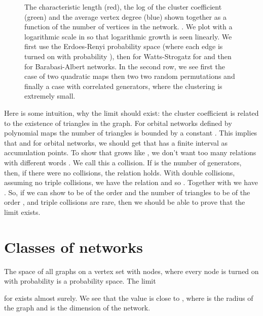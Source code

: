 \documentclass[12pt]{amsart}
\theoremstyle{definition}
\begin{document}
\begin{figure}
\caption{
The characteristic length  (red), the log of the cluster coefficient  (green)
and the average vertex degree  (blue) shown together as a function of the number of vertices
in the network. . We plot with a logarithmic
scale in  so that logarithmic growth is seen linearly.
We first use the Erdoes-Renyi probability space (where each edge is turned on
with probability ), then for Watts-Strogatz for  and then for 
Barabasi-Albert \cite{Barabasialbert}
networks. In the second row, we see first the case of two quadratic maps \cite{KnillOrbital3}
then two two random permutations and finally a case with correlated
generators, where the clustering is extremely small. 
}
\end{figure}

Here is some intuition, why the limit should exist: the cluster coefficient is related to the 
existence of triangles in the graph. For orbital networks \cite{KnillOrbital1,KnillOrbital2,KnillOrbital3}
defined by polynomial maps the number of triangles is bounded by a constant . This implies that 
 and  for orbital networks, we should get that
 has a finite interval as accumulation points. 
To show that  grows like , we don't want 
too many relations  with different words . We call this a collision. 
If   is the number of generators, then, if there were no collisions, the relation
 holds. With  double collisions, assuming no triple collisions, we have
the relation  and so . Together with 
we have . 
So, if we can show  to be of the order  and the number of triangles to be 
of the order , and triple collisions are rare, then we should be able to prove that the 
limit exists. 

\section{Classes of networks}

The space  of all graphs on a vertex set with  nodes, where every node is turned on 
with probability  is a probability space. The limit 
 
for  exists almost surely. We see that the value is
close to , where  is the radius of the graph and  is
the dimension of the network. \\
\end{document}
